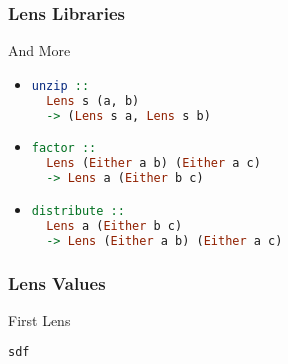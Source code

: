 \begin{frame}[fragile]
\frametitle{Lens Libraries}

\begin{block}{And More}
\begin{itemize}
\item \begin{lstlisting}[language=haskell]
unzip ::
  Lens s (a, b)
  -> (Lens s a, Lens s b)
\end{lstlisting}

\item \begin{lstlisting}[language=haskell]
factor ::
  Lens (Either a b) (Either a c)
  -> Lens a (Either b c)
\end{lstlisting}

\item \begin{lstlisting}[language=haskell]
distribute ::
  Lens a (Either b c)
  -> Lens (Either a b) (Either a c)
\end{lstlisting}
\end{itemize}
\end{block}

\end{frame}
\begin{frame}[fragile]
\frametitle{Lens Values}

\begin{block}{First Lens}
\begin{lstlisting}[language=haskell]
sdf
\end{lstlisting}
\end{block}

\end{frame}

